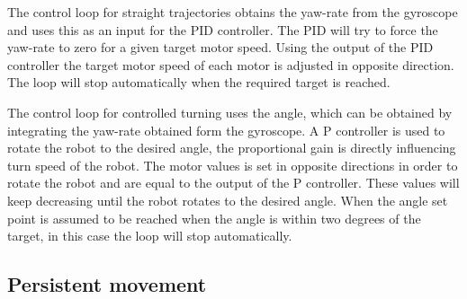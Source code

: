 The control loop for straight trajectories obtains the yaw-rate from the gyroscope and uses this as an input for the PID controller.
The PID will try to force the yaw-rate to zero for a given target motor speed.
Using the output of the PID controller the target motor speed of each motor is adjusted in opposite direction.
The loop will stop automatically when the required target is reached.

The control loop for controlled turning uses the angle, which can be obtained by integrating the yaw-rate obtained form the gyroscope.
A P controller is used to rotate the robot to the desired angle, the proportional gain is directly influencing turn speed of the robot.
The motor values is set in opposite directions in order to rotate the robot and are equal to the output of the P controller.
These values will keep decreasing until the robot rotates to the desired angle.
When the angle set point is assumed to be reached when the angle is within two degrees of the target, in this case the loop will stop automatically.

\subsection{Persistent movement}